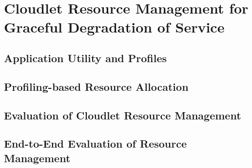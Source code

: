 \section{Cloudlet Resource Management for Graceful Degradation of Service}
% 
\subsection{Application Utility and Profiles}
\subsection{Profiling-based Resource Allocation}
\subsection{Evaluation of Cloudlet Resource Management}
\subsection{End-to-End Evaluation of Resource Management}